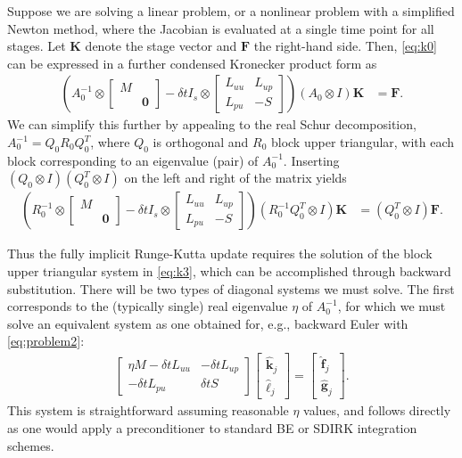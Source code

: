 \documentclass[a4paper,10pt]{article}
\begin{document}
Suppose we are solving a linear problem, or a nonlinear problem with a simplified
Newton method, where the Jacobian is evaluated at a single time point for all
stages. Let $\mathbf{K}$ denote the stage vector and $\mathbf{F}$ the right-hand
side. Then, \eqref{eq:k0} can be expressed in a further condensed Kronecker
product form as
%
\begin{align}\label{eq:k2}
\left(A_0^{-1} \otimes \begin{bmatrix} M \\ & \mathbf{0}\end{bmatrix}
	- \delta t I_s \otimes \begin{bmatrix} L_{uu} & L_{up} \\ L_{pu} & -S \end{bmatrix} \right)
	(A_0\otimes I)\mathbf{K} & = \mathbf{F}.
\end{align}
%
We can simplify this further by appealing to the real Schur decomposition,
$A_0^{-1} = Q_0R_0Q_0^T$, where $Q_0$ is orthogonal and $R_0$ block upper
triangular, with each block corresponding to an eigenvalue (pair) of $A_0^{-1}$.
Inserting $(Q_0\otimes I)(Q_0^T\otimes I)$ on the left and right of the
matrix yields
%
\begin{align}\label{eq:k3}
\left(R_0^{-1} \otimes \begin{bmatrix} M \\ & \mathbf{0}\end{bmatrix}
	- \delta t I_s \otimes \begin{bmatrix} L_{uu} & L_{up} \\ L_{pu} & -S \end{bmatrix} \right)
	(R_0^{-1}Q_0^T\otimes I)\mathbf{K} & = (Q_0^T\otimes I)\mathbf{F}.
\end{align}
%

Thus the fully implicit Runge-Kutta update requires the solution of the
block upper triangular system in \eqref{eq:k3}, which can be accomplished
through backward substitution. There will be two types of diagonal systems
we must solve. The first corresponds to the (typically single) real eigenvalue
$\eta$ of $A_0^{-1}$, for which we must solve an equivalent system as one
obtained for, e.g., backward Euler with \eqref{eq:problem2}:
%
\begin{align}\label{eq:R1}
\begin{bmatrix} \eta M - \delta tL_{uu} & -\delta tL_{up} \\ -\delta tL_{pu} & \delta tS
	\end{bmatrix}
	\begin{bmatrix} \hat{\mathbf{k}}_j \\ \hat{\ell}_j\end{bmatrix} =
	\begin{bmatrix} \hat{\mathbf{f}}_j \\ \hat{\mathbf{g}}_j \end{bmatrix}.
\end{align}
%
This system is straightforward assuming reasonable $\eta$ values, and
follows directly as one would apply a preconditioner to standard BE or
SDIRK integration schemes.
\end{document}
